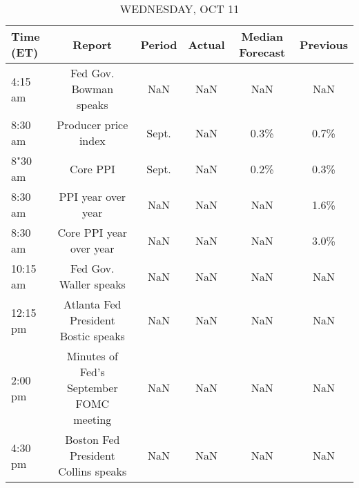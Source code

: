 \documentclass{article}%
\begin{document}
\begin{table}[htbp]%
\caption{WEDNESDAY, OCT 11}%
\centering%
\begin{adjustbox}{width=1\textwidth}%
\begin{tabular}{lccccc}
\toprule
Time (ET) &                                  Report & Period & Actual & Median Forecast & Previous \\
\midrule
  4:15 am &                  Fed Gov. Bowman speaks &    NaN &    NaN &             NaN &      NaN \\
  8:30 am &                    Producer price index &  Sept. &    NaN &            0.3\% &     0.7\% \\
  8"30 am &                                Core PPI &  Sept. &    NaN &            0.2\% &     0.3\% \\
  8:30 am &                      PPI year over year &    NaN &    NaN &             NaN &     1.6\% \\
  8:30 am &                 Core PPI year over year &    NaN &    NaN &             NaN &     3.0\% \\
 10:15 am &                  Fed Gov. Waller speaks &    NaN &    NaN &             NaN &      NaN \\
 12:15 pm &     Atlanta Fed President Bostic speaks &    NaN &    NaN &             NaN &      NaN \\
  2:00 pm & Minutes of Fed's September FOMC meeting &    NaN &    NaN &             NaN &      NaN \\
  4:30 pm &     Boston Fed President Collins speaks &    NaN &    NaN &             NaN &      NaN \\
\bottomrule
\end{tabular}
%
\end{adjustbox}%
\end{table}

%
\end{document}

